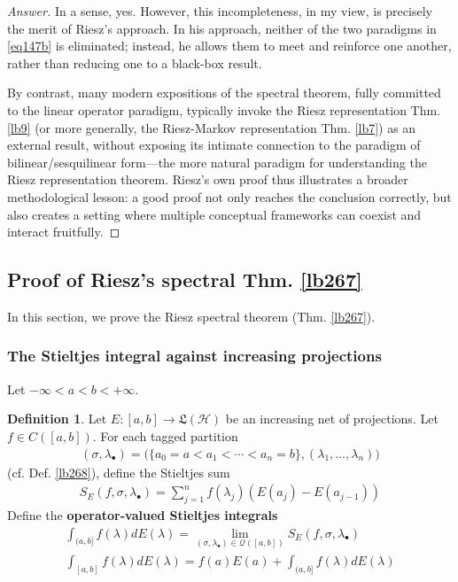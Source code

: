 \documentclass[12pt,b5paper,notitlepage]{article}
\theoremstyle{definition}
\newtheorem{df}{Definition}[subsection]
\theoremstyle{plain}
\newcommand{\fk}{\mathfrak}
\newcommand{\mc}{\mathcal}
\newcommand{\blt}{\bullet}
\numberwithin{equation}{section}
\begin{document}
\begin{proof}[Answer]
In a sense, yes. However, this incompleteness, in my view, is precisely the merit of Riesz's approach. In his approach, neither of the two paradigms in \eqref{eq147b} is eliminated; instead, he allows them to meet and reinforce one another, rather than reducing one to a black-box result.

By contrast, many modern expositions of the spectral theorem, fully committed to the linear operator paradigm, typically invoke the Riesz representation Thm. \ref{lb9} (or more generally, the Riesz-Markov representation Thm. \ref{lb7}) as an external result, without exposing its intimate connection to the paradigm of bilinear/sesquilinear form---the more natural paradigm for understanding the Riesz representation theorem. Riesz's own proof thus illustrates a broader methodological lesson: a good proof not only reaches the conclusion correctly, but also creates a setting where multiple conceptual frameworks can coexist and interact fruitfully.
\end{proof}





\subsection{Proof of Riesz's spectral Thm. \ref{lb267}}\label{lb278}


In this section, we prove the Riesz spectral theorem (Thm. \ref{lb267}).


\subsubsection{The Stieltjes integral against increasing projections}\label{lb288}


Let $-\infty<a<b<+\infty$.

\begin{df}
Let $E:[a,b]\rightarrow\fk L(\mc H)$ be an increasing net of projections. Let $f\in C([a,b])$. For each tagged partition 
\begin{align*}
(\sigma,\lambda_\blt)=\big(\{a_0=a<a_1<\cdots<a_n=b\},(\lambda_1,\dots,\lambda_n) \big)
\end{align*}
(cf. Def. \ref{lb268}), define the Stieltjes sum
\begin{align*}
S_E(f,\sigma,\lambda_\blt)=\sum_{j=1}^n f(\lambda_j)(E(a_j)-E(a_{j-1}))
\end{align*}
Define the \textbf{operator-valued Stieltjes integrals}
\begin{gather}
\int_{(a,b]} f(\lambda)dE(\lambda)=\lim_{(\sigma,\lambda_\blt)\in\mc Q([a,b])}S_E(f,\sigma,\lambda_\blt)\label{eq148}\\
\int_{[a,b]} f(\lambda)dE(\lambda)=f(a)E(a)+\int_{(a,b]} f(\lambda)dE(\lambda)
\end{gather}
\end{df}
\end{document}

